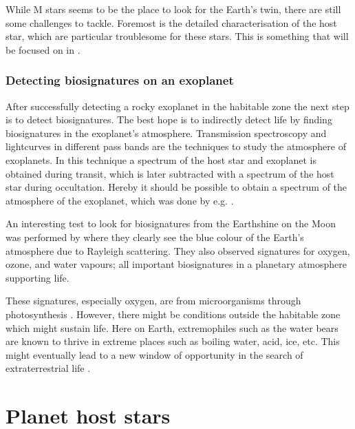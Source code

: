 While M stars seems to be the place to look for the Earth's twin, there are still some challenges to
tackle. Foremost is the detailed characterisation of the host star, which are particular troublesome
for these stars. This is something that will be focused on in .

\subsubsection{Detecting biosignatures on an exoplanet}

After successfully detecting a rocky exoplanet in the habitable zone the next step is to detect
biosignatures. The best hope is to indirectly detect life by finding biosignatures
\citep{Kasting2002} in the exoplanet's atmosphere. Transmission spectroscopy and lightcurves in
different pass bands are the techniques to study the atmosphere of exoplanets. In this technique a
spectrum of the host star and exoplanet is obtained during transit, which is later subtracted with a
spectrum of the host star during occultation. Hereby it should be possible to obtain a spectrum of
the atmosphere of the exoplanet, which was done by e.g. \citet{Charbonneau2002}.

An interesting test to look for biosignatures from the Earthshine on the Moon was performed by
\citet{Arnold2002} where they clearly see the blue colour of the Earth's atmosphere due to Rayleigh
scattering. They also observed signatures for oxygen, ozone, and water vapours; all important
biosignatures in a planetary atmosphere supporting life.

These signatures, especially oxygen, are from microorganisms through photosynthesis
\citep[see e.g.][]{Kasting2002}. However, there might be conditions outside the habitable zone which
might sustain life. Here on Earth, extremophiles such as the water bears are known to thrive in
extreme places such as boiling water, acid, ice, etc. This might eventually lead to a new window of
opportunity in the search of extraterrestrial life \citep{Cavicchioli2002}.



\section{Planet host stars}
\label{sec:planet_host_stars}


